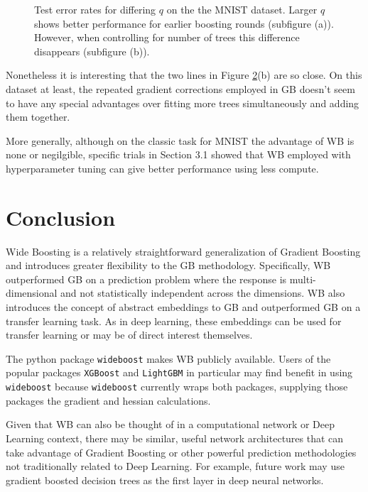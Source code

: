 \documentclass{article}
\begin{document}
\begin{figure}[h]
\begin{subfigure}[b]{0.45\textwidth}
         \label{fig:b}
     \end{subfigure}
     \label{fig:beta}
    \caption{Test error rates for differing $q$ on the the MNIST dataset. Larger $q$ shows better performance for earlier boosting rounds (subfigure (a)). However, when controlling for number of trees this difference disappears (subfigure (b)).}
    \label{fig:full}
\end{figure}

Nonetheless it is interesting that the two lines in Figure \ref{fig:full}(b) are so close.  On this dataset at least, the repeated gradient corrections employed in GB doesn't seem to have any special advantages over fitting more trees simultaneously and adding them together.

More generally, although on the classic task for MNIST the advantage of WB is none or negilgible, specific trials in Section 3.1 showed that WB employed with hyperparameter tuning can give better performance using less compute.


\section{Conclusion}

Wide Boosting is a relatively straightforward generalization of Gradient Boosting and introduces greater flexibility to the GB methodology. Specifically, WB outperformed GB on a prediction problem where the response is multi-dimensional and not statistically independent across the dimensions.  WB also introduces the concept of abstract embeddings to GB and outperformed GB on a transfer learning task. As in deep learning, these embeddings can be used for transfer learning or may be of direct interest themselves.

The python package \texttt{wideboost} makes WB publicly available. Users of the popular packages \texttt{XGBoost} and \texttt{LightGBM} in particular may find benefit in using \texttt{wideboost} because \texttt{wideboost} currently wraps both packages, supplying those packages the gradient and hessian calculations.

Given that WB can also be thought of in a computational network or Deep Learning context, there may be similar, useful network architectures that can take advantage of Gradient Boosting or other powerful prediction methodologies not traditionally related to Deep Learning. For example, future work may use gradient boosted decision trees as the first layer in deep neural networks.
\end{document}
